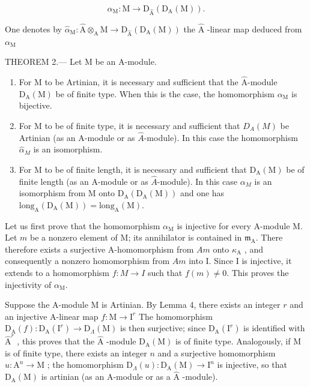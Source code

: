 \[
\alpha_ {\mathrm{M}}: \mathrm{M} \longrightarrow \mathrm{D} _ {\widehat {\mathrm{A}}} (\mathrm{D} _ {\mathrm{A}} (\mathrm{M})) .
\]

One denotes by \(\widehat{\alpha}_{\mathrm{M}}:\widehat{\mathrm{A}}\otimes_{\mathrm{A}}\mathrm{M}\longrightarrow \mathrm{D}_{\widehat{\mathrm{A}}}(\mathrm{D}_{\mathrm{A}}(\mathrm{M}))\) the \(\widehat{\mathrm{A}}\) -linear map deduced from \(\alpha_{\mathrm{M}}\)

THEOREM 2.--- Let M be an A-module.

\begin{enumerate}
\def\labelenumi{\alph{enumi})}
\item
  For M to be Artinian, it is necessary and sufficient that the \(\hat{\mathrm{A}}\)-module \(\mathrm{D}_{\mathrm{A}}(\mathrm{M})\) be of finite type. When this is the case, the homomorphism \(\alpha_{\mathrm{M}}\) is bijective.
\item
  For M to be of finite type, it is necessary and sufficient that \(D_{A}(M)\) be Artinian (as an A-module or as \(\hat{A}\)-module). In this case the homomorphism \(\hat{\alpha}_{M}\) is an isomorphism.
\item
  For M to be of finite length, it is necessary and sufficient that \(\mathrm{D}_{\mathrm{A}}(\mathrm{M})\) be of finite length (as an A-module or as \(\widehat{A}\)-module). In this case \(\alpha_{M}\) is an isomorphism from M onto \(\mathrm{D}_{\mathrm{A}}(\mathrm{D}_{\mathrm{A}}(\mathrm{M}))\) and one has \(\mathrm{long}_{\mathrm{A}}(\mathrm{D}_{\mathrm{A}}(\mathrm{M})) = \mathrm{long}_{\mathrm{A}}(\mathrm{M})\).
\end{enumerate}

Let us first prove that the homomorphism \(\alpha_{\mathrm{M}}\) is injective for every A-module M. Let \(m\) be a nonzero element of M; its annihilator is contained in \(\mathfrak{m}_{\mathrm{A}}\). There therefore exists a surjective A-homomorphism from \(Am\) onto \(\kappa_{\mathrm{A}}\) , and consequently a nonzero homomorphism from \(Am\) into I. Since I is injective, it extends to a homomorphism \(f:M\to I\) such that \(f(m)\neq0\). This proves the injectivity of \(\alpha_{\mathrm{M}}\).

Suppose the A-module M is Artinian. By Lemma 4, there exists an integer \(r\) and an injective A-linear map \(f: \mathrm{M} \to \mathrm{I}^r\) The homomorphism \(\mathrm{D}_{\mathrm{A}}(f): \mathrm{D}_{\mathrm{A}}(\mathrm{I}^r) \longrightarrow \mathrm{D}_{\Lambda}(\mathrm{M})\) is then surjective; since \(\mathrm{D}_{\mathrm{A}}(\mathrm{I}^r)\) is identified with \(\widehat{\mathrm{A}}^r\) , this proves that the \(\widehat{\mathrm{A}}\) -module \(\mathrm{D}_{\mathrm{A}}(\mathrm{M})\) is of finite type. Analogously, if M is of finite type, there exists an integer \(n\) and a surjective homomorphism \(u: \mathrm{A}^n \to \mathrm{M}\) ; the homomorphism \(\mathrm{D}_{\Lambda}(u): \mathrm{D}_{\mathrm{A}}(\mathrm{M}) \to \mathrm{I}^n\) is injective, so that \(\mathrm{D}_{\mathrm{A}}(\mathrm{M})\) is artinian (as an A-module or as a \(\widehat{\mathrm{A}}\) -module).


